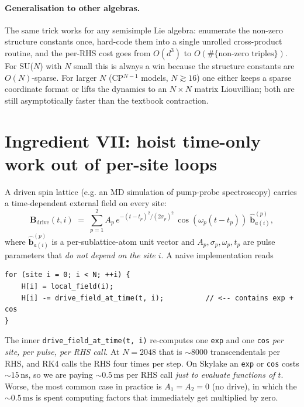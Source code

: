 \documentclass[11pt,letterpaper]{article}
\begin{document}
\paragraph{Generalisation to other algebras.}
The same trick works for any semisimple Lie algebra: enumerate the
non-zero structure constants once, hard-code them into a single
unrolled cross-product routine, and the per-RHS cost goes from
$O(d^{3})$ to $O(\#\{\text{non-zero triples}\})$.  For SU($N$) with
$N$ small this is always a win because the structure constants are
$O(N)$-sparse.  For larger $N$ (CP$^{N-1}$ models, $N \gtrsim 16$) one
either keeps a sparse coordinate format or lifts the dynamics to an
$N \times N$ matrix Liouvillian; both are still asymptotically faster
than the textbook contraction.

\section{Ingredient VII: hoist time-only work out of per-site loops}
\label{sec:hoist-time}

A driven spin lattice (e.g. an MD simulation of pump-probe
spectroscopy) carries a time-dependent external field on every site:
\[
   \mathbf{B}_{\text{drive}}(t, i) \;=\;
       \sum_{p=1}^{2} A_p \,
                       e^{-(t - t_p)^2 / (2\sigma_p)^2}\,
                       \cos(\omega_p (t - t_p))\;
                       \hat{\mathbf{b}}^{(p)}_{a(i)},
\]
where $\hat{\mathbf{b}}^{(p)}_{a(i)}$ is a per-sublattice-atom unit
vector and $A_p, \sigma_p, \omega_p, t_p$ are pulse parameters that
\emph{do not depend on the site $i$}.  A naive implementation reads
\begin{lstlisting}
for (site i = 0; i < N; ++i) {
    H[i] = local_field(i);
    H[i] -= drive_field_at_time(t, i);          // <-- contains exp + cos
}
\end{lstlisting}
The inner \texttt{drive\_field\_at\_time(t, i)} re-computes one
\texttt{exp} and one \texttt{cos} \emph{per site, per pulse, per RHS
call}.  At $N = 2048$ that is $\sim 8000$ transcendentals per RHS, and
RK4 calls the RHS four times per step.  On Skylake an \texttt{exp} or
\texttt{cos} costs $\sim 15\,\mathrm{ns}$, so we are paying
$\sim 0.5\,\mathrm{ms}$ per RHS call \emph{just to evaluate functions
of $t$}.  Worse, the most common case in practice is
$A_1 = A_2 = 0$ (no drive), in which the $\sim 0.5\,\mathrm{ms}$ is
spent computing factors that immediately get multiplied by zero.
\end{document}
